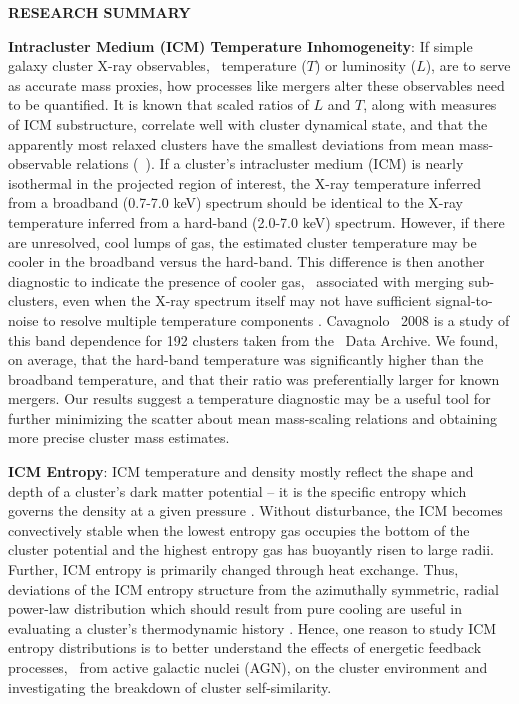 \documentclass[letterpaper,12pt]{article}
\begin{document}
\begin{center}
  {\bf\uppercase{Research Summary}}
\end{center}

{\bf Intracluster Medium (ICM) Temperature Inhomogeneity}: If simple
galaxy cluster X-ray observables, \eg\ temperature ($T$) or luminosity
($L$), are to serve as accurate mass proxies, how processes like
mergers alter these observables need to be quantified. It is known
that scaled ratios of $L$ and $T$, along with measures of ICM
substructure, correlate well with cluster dynamical state, and that
the apparently most relaxed clusters have the smallest deviations from
mean mass-observable relations (\eg\ \cite{kravtsov06, VV08}). If a
cluster's intracluster medium (ICM) is nearly isothermal in the
projected region of interest, the X-ray temperature inferred from a
broadband (0.7-7.0 keV) spectrum should be identical to the X-ray
temperature inferred from a hard-band (2.0-7.0 keV) spectrum. However,
if there are unresolved, cool lumps of gas, the estimated cluster
temperature may be cooler in the broadband versus the hard-band. This
difference is then another diagnostic to indicate the presence of
cooler gas, \eg\ associated with merging sub-clusters, even when the
X-ray spectrum itself may not have sufficient signal-to-noise to
resolve multiple temperature components \cite{me01}. Cavagnolo
\etal\ 2008 is a study of this band dependence for 192 clusters taken
from the \chandra\ Data Archive. We found, on average, that the
hard-band temperature was significantly higher than the broadband
temperature, and that their ratio was preferentially larger for known
mergers. Our results suggest a temperature diagnostic may be a useful
tool for further minimizing the scatter about mean mass-scaling
relations and obtaining more precise cluster mass estimates.

{\bf ICM Entropy}: ICM temperature and density mostly reflect the
shape and depth of a cluster's dark matter potential -- it is the
specific entropy which governs the density at a given pressure
\cite{voitbryan}. Without disturbance, the ICM becomes convectively
stable when the lowest entropy gas occupies the bottom of the cluster
potential and the highest entropy gas has buoyantly risen to large
radii. Further, ICM entropy is primarily changed through heat
exchange. Thus, deviations of the ICM entropy structure from the
azimuthally symmetric, radial power-law distribution which should
result from pure cooling are useful in evaluating a cluster's
thermodynamic history \cite{voitbryan}. Hence, one reason to study ICM
entropy distributions is to better understand the effects of energetic
feedback processes, \eg\ from active galactic nuclei (AGN), on the
cluster environment and investigating the breakdown of cluster
self-similarity.
\end{document}
